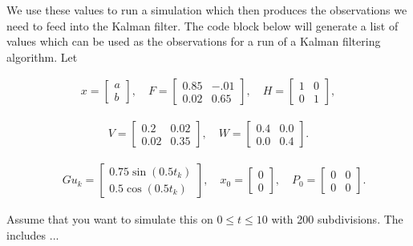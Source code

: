 We use these values to run a simulation which then produces the
observations we need to feed into the Kalman filter. The code block
below will generate a list of values which can be used as the
observations for a run of a Kalman filtering algorithm. Let

\[\begin{aligned}
x = \begin{bmatrix}a \\ b\end{bmatrix}, \quad
F = \begin{bmatrix} 0.85 &-.01 \\0.02 &0.65\end{bmatrix}, \quad
H = \begin{bmatrix} 1& 0 \\ 0 & 1 \end{bmatrix},
\end{aligned}\]

\[\begin{aligned}
V = \begin{bmatrix} 0.2 & 0.02 \\ 0.02 & 0.35 \end{bmatrix}, \quad
W = \begin{bmatrix}  0.4 & 0.0 \\ 0.0 & 0.4  \end{bmatrix} .
\end{aligned}\]

\[\begin{aligned}
\quad Gu_k = \begin{bmatrix}0.75\sin(0.5t_k) \\ 0.5\cos(0.5t_k) \end{bmatrix}, \quad
x_0 = \begin{bmatrix} 0\\0\end{bmatrix}, \quad
P_0 = \begin{bmatrix}0 & 0\\ 0&0\end{bmatrix}.
\end{aligned}\]

Assume that you want to simulate this on \(0 \leq t \leq 10\) with 200
subdivisions. The includes ...

\begin{Shaded}
\begin{Highlighting}[]
 \OperatorTok{,}
\OperatorTok{,}
\end{Highlighting}
\end{Shaded}

